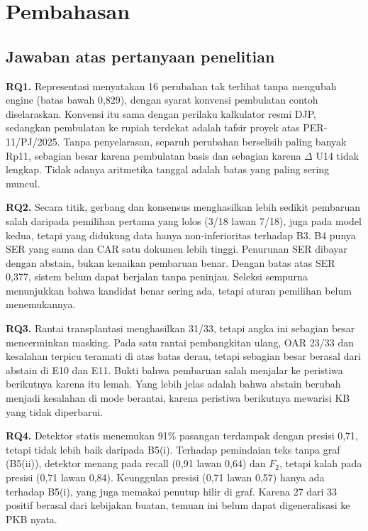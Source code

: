 \documentclass[journal,a4paper]{IEEEtran}
\makeatletter
\DeclareRobustCommand{\en}[1]{{\usefont{\f@encoding}{\f@family}{\f@series}{it}#1\/}}
\makeatother
\begin{document}
\section{Pembahasan}
\label{sec:pembahasan}
\subsection{Jawaban atas pertanyaan penelitian}
\textbf{RQ1.} Representasi menyatakan 16 perubahan tak terlihat tanpa mengubah \en{engine} (batas bawah 0,829), dengan syarat konvensi pembulatan contoh diselaraskan. Konvensi itu sama dengan perilaku kalkulator resmi DJP, sedangkan pembulatan ke rupiah terdekat adalah tafsir proyek atas PER-11/PJ/2025. Tanpa penyelarasan, separuh perubahan berselisih paling banyak Rp11, sebagian besar karena pembulatan basis dan sebagian karena $\Delta$ U14 tidak lengkap. Tidak adanya aritmetika tanggal adalah batas yang paling sering muncul.

\textbf{RQ2.} Secara titik, gerbang dan konsensus menghasilkan lebih sedikit pembaruan salah daripada pemilihan pertama yang lolos (3/18 lawan 7/18), juga pada model kedua, tetapi yang didukung data hanya non-inferioritas terhadap B3. B4 punya SER yang sama dan CAR satu dokumen lebih tinggi. Penurunan SER dibayar dengan \en{abstain}, bukan kenaikan pembaruan benar. Dengan batas atas SER 0,377, sistem belum dapat berjalan tanpa peninjau. Seleksi sempurna menunjukkan bahwa kandidat benar sering ada, tetapi aturan pemilihan belum menemukannya.

\textbf{RQ3.} Rantai transplantasi menghasilkan 31/33, tetapi angka ini sebagian besar mencerminkan \en{masking}. Pada satu rantai pembangkitan ulang, OAR 23/33 dan kesalahan terpicu teramati di atas batas derau, tetapi sebagian besar berasal dari \en{abstain} di E10 dan E11. Bukti bahwa pembaruan salah menjalar ke peristiwa berikutnya karena itu lemah. Yang lebih jelas adalah bahwa \en{abstain} berubah menjadi kesalahan di mode berantai, karena peristiwa berikutnya mewarisi KB yang tidak diperbarui.

\textbf{RQ4.} Detektor statis menemukan 91\% pasangan terdampak dengan presisi 0,71, tetapi tidak lebih baik daripada B5(i). Terhadap pemindaian teks tanpa graf (B5(ii)), detektor menang pada \en{recall} (0,91 lawan 0,64) dan $F_2$, tetapi kalah pada presisi (0,71 lawan 0,84). Keunggulan presisi (0,71 lawan 0,57) hanya ada terhadap B5(i), yang juga memakai penutup hilir di graf. Karena 27 dari 33 positif berasal dari kebijakan buatan, temuan ini belum dapat digeneralisasi ke PKB nyata.
\end{document}

